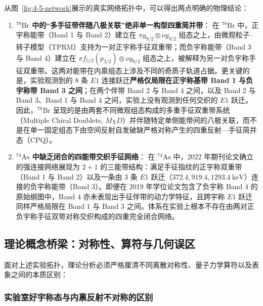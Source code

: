 从图~\ref{fig:4-5-network}展示的真实网络拓扑中，可以得出两点明确的物理结论：
\begin{enumerate}
\item \textbf{$^{78}\mathrm{Br}$ 中的“多手征带伴随八极关联”绝非单一构型四重简并带}：
在 $^{78}\mathrm{Br}$ 中，正宇称能带（Band 1 与 Band 2）建立在 $\pi g_{9/2} \otimes \nu g_{9/2}$ 组态之上，由微观粒子--转子模型（TPRM）支持为一对正宇称手征双重带；而负宇称能带（Band 3 与 Band 4）建立在 $\pi f_{5/2}(p_{3/2}) \otimes \nu g_{9/2}$ 组态之上，被解释为另一对负宇称手征双重带。这两对能带在内禀组态上涉及不同的奇质子轨道占据。更关键的是，实验观测到的 8 条 $E1$ 连接跃迁\textbf{严格仅局限在正宇称基带 Band 1 与负宇称带 Band 3 之间}；在两个伴带 Band 2 与 Band 4 之间，以及 Band 2 与 Band 3、Band 1 与 Band 4 之间，实验上没有观测到任何交织的 $E1$ 跃迁。因此，$^{78}\mathrm{Br}$ 呈现的是由两套不同微观组态构成的多重手征双重带系统（Multiple Chiral Doublets, $M\chi D$）并伴随特定单侧能带间的八极关联，而不是在单一固定组态下由空间反射自发破缺严格对称产生的四重反射---手征简并态（CPQ）。
\item \textbf{$^{74}\mathrm{As}$ 中缺乏闭合的四能带交织手征网络}：
在 $^{74}\mathrm{As}$ 中，2022 年期刊论文确立的强连接网络展现为 $2+1$ 的三能带结构：满足手征指纹的正宇称双重带（Band 1 与 Band 2）以及一条由 3 条 $E1$ 跃迁（$372.4, 919.4, 1293.4\ \mathrm{keV}$）连接的负宇称能带（Band 3）。即便在 2019 年学位论文包含了负宇称 Band 4 的原始纲图中，Band 4 亦未表现出手征伴带的动力学特征，且跨宇称 $E1$ 跃迁同样严格局限在 Band 1 与 Band 3 之间。体系在实验上根本不存在由两对正负宇称手征双带对称交织构成的四重完全闭合网络。
\end{enumerate}

\subsection{理论概念桥梁：对称性、算符与几何误区}\label{sec:4-5-3}

面对上述实验拓扑，理论分析必须严格厘清不同离散对称性、量子力学算符以及表象之间的本质区别：

\subsubsection{实验室好宇称态与内禀反射不对称的区别}

